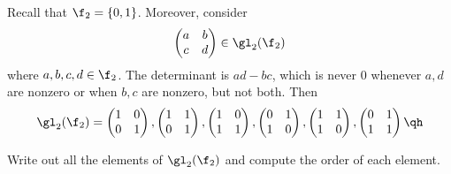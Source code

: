 \begin{sol}
    Recall that $\f_2 = \{0, 1\}$. Moreover, consider
    \[
    \begin{pmatrix}
        a & b \\
        c & d
    \end{pmatrix} \in \gl_2(\f_2)
    \]
    where $a, b, c, d \in \f_2$. The determinant is $ad - bc$, which is never 0 whenever $a, d$ are nonzero or when $b, c$ are nonzero, but not both. Then
    \[\gl_2(\f_2) = 
    \begin{pmatrix}
        1 & 0 \\
        0 & 1
    \end{pmatrix}, 
    \begin{pmatrix}
        1 & 1 \\
        0 & 1
    \end{pmatrix},
    \begin{pmatrix}
        1 & 0 \\
        1 & 1
    \end{pmatrix},
    \begin{pmatrix}
        0 & 1 \\
        1 & 0
    \end{pmatrix},
    \begin{pmatrix}
        1 & 1 \\
        1 & 0
    \end{pmatrix},
    \begin{pmatrix}
        0 & 1 \\
        1 & 1
    \end{pmatrix} \qh
    \]
\end{sol}

\begin{exercise}\label{ex1.4.2}
    Write out all the elements of $\gl_2(\f_2)$ and compute the order of each element.
\end{exercise}

